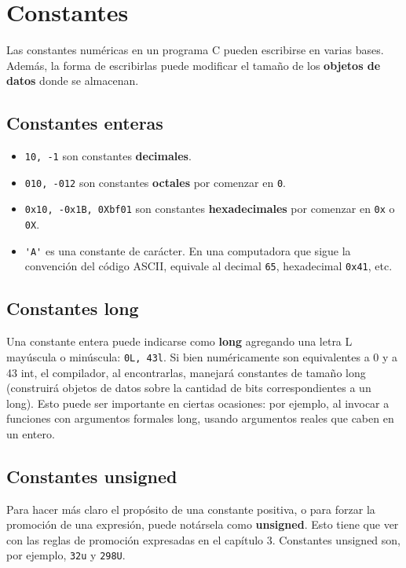 \chapter{Constantes}
Las constantes numéricas en un programa C pueden escribirse en varias bases. Además, la forma de escribirlas puede modificar el tamaño de los \textbf{objetos de datos} donde se almacenan.

\section{Constantes enteras}
\begin{itemize}
	\item \lstinline{10, -1} son constantes \textbf{decimales}.
	\item \lstinline{010, -012} son constantes \textbf{octales} por comenzar en \texttt{0}.
	\item \lstinline{0x10, -0x1B, 0Xbf01} son constantes \textbf{hexadecimales} por comenzar en \texttt{0x} o \texttt{0X}.
	\item \lstinline{'A'} es una constante de carácter. En una computadora que sigue la convención del código ASCII,
equivale al decimal \texttt{65}, hexadecimal \texttt{0x41}, etc.
\end{itemize}


\section{Constantes long} 
Una constante entera puede indicarse como \textbf{long} agregando una letra L mayúscula o minúscula: \lstinline{0L, 43l}.
Si bien numéricamente son equivalentes a 0 y a 43 int, el compilador, al encontrarlas, manejará
constantes de tamaño long (construirá objetos de datos sobre la cantidad de bits correspondientes a un
long). Esto puede ser importante en ciertas ocasiones: por ejemplo, al invocar a funciones con
argumentos formales long, usando argumentos reales que caben en un entero.
	
\section{Constantes unsigned}
Para hacer más claro el propósito de una constante positiva, o para forzar la promoción de una
expresión, puede notársela como \textbf{unsigned}. Esto tiene que ver con las reglas de promoción expresadas
en el capítulo 3. Constantes unsigned son, por ejemplo, \texttt{32u} y \texttt{298U}. 

